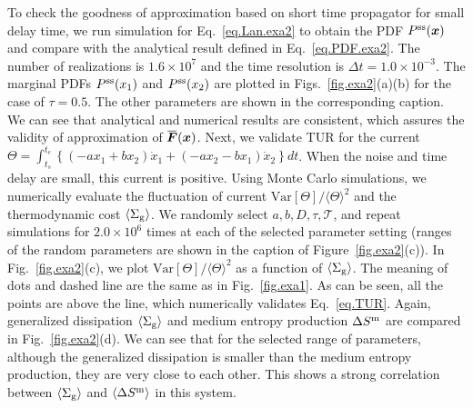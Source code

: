 \documentclass[pre,
twocolumn,
]{revtex4-1}
\newcommand{\overbar}[1]{\mkern 1.5mu\overline{\mkern-1.5mu#1\mkern-1.5mu}\mkern 1.5mu}
\theoremstyle{definition}
\theoremstyle{definition}
\newcommand{\bol}{\boldsymbol}
\newcommand{\mca}{\mathcal}
\newcommand{\mrm}{\mathrm}
\newcommand{\avg}[1]{\langle #1\rangle}
\newcommand{\inl}[1]{$ #1 $}
\begin{document}
To check the goodness of approximation based on short time propagator for small delay time, we run simulation for Eq.~\eqref{eq.Lan.exa2} to obtain the PDF \inl{P^{\rm ss}(\bol{x})} and compare with the analytical result defined in Eq.~\eqref{eq.PDF.exa2}.
The number of realizations is \inl{1.6\times 10^7} and the time resolution is \inl{\Delta t=1.0\times 10^{-3}}.
The marginal PDFs \inl{P^{\rm ss}(x_1)} and \inl{P^{\rm ss}(x_2)} are plotted in Figs.~\ref{fig.exa2}(a)(b) for the case of \inl{\tau=0.5}.
The other parameters are shown in the corresponding caption.
We can see that analytical and numerical results are consistent, which assures the validity of approximation of \inl{\overbar{\bol{F}}(\bol{x})}.
Next, we validate TUR for the current \inl{\Theta=\int_{t_s}^{t_e} \left\{(-ax_1+bx_2)\dot{x}_1+(-ax_2-bx_1)\dot{x}_2\right\}dt}.
When the noise and time delay are small, this current is positive. 
Using Monte Carlo simulations, we numerically evaluate the fluctuation of current \inl{\mrm{Var}[\Theta]/\avg{\Theta}^2} and the thermodynamic cost \inl{\avg{\Sigma_{\rm g}}}.
We randomly select \inl{a,b,D,\tau,\mca{T}}, and repeat simulations for \inl{2.0\times 10^6} times at each of the selected parameter setting (ranges of the random parameters are shown in the caption
of Figure~\ref{fig.exa2}(c)).
In Fig.~\ref{fig.exa2}(c), we plot \inl{\mrm{Var}[\Theta]/\avg{\Theta}^2} as a function of \inl{\avg{\Sigma_{\rm g}}}.
The meaning of dots and dashed line are the same as in Fig.~\ref{fig.exa1}.
As can be seen, all the points are above the line, which numerically validates Eq.~\eqref{eq.TUR}.
Again, generalized dissipation \inl{\avg{\Sigma_{\rm g}}} and medium entropy production \inl{\Delta S^{\rm m}} are compared in Fig.~\ref{fig.exa2}(d).
We can see that for the selected range of parameters, although the generalized dissipation is smaller than the medium entropy production, they are very close to each other.
This shows a strong correlation between \inl{\avg{\Sigma_{\rm g}}} and \inl{\avg{\Delta S^{\rm m}}} in this system.
\end{document}
